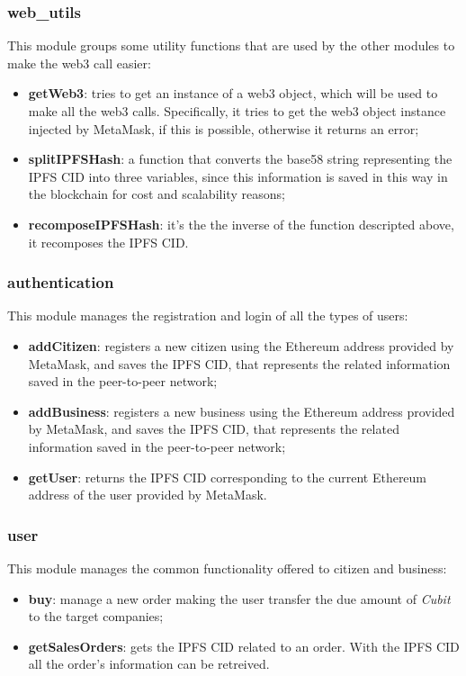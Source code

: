 \subsubsection{web\_utils}
This module groups some utility functions that are used by the other modules to make the web3 call easier:
\begin{itemize}
	\item \textbf{getWeb3}: tries to get an instance of a web3 object, which will be used to make all the web3 calls. Specifically, it tries to get the web3 object instance injected by MetaMask, if this is possible, otherwise it returns an error;
	\item \textbf{splitIPFSHash}: a function that converts the base58 string representing the IPFS CID into three variables, since this information is saved in this way in the blockchain for cost and scalability reasons;
	\item \textbf{recomposeIPFSHash}: it's the the inverse of the function descripted above, it recomposes the IPFS CID.
\end{itemize} 

\subsubsection{authentication}
This module manages the registration and login of all the types of users:
\begin{itemize}
	\item \textbf{addCitizen}: registers a new citizen using the Ethereum address provided by MetaMask, and saves the IPFS CID, that represents the related information saved in the peer-to-peer network;
	\item \textbf{addBusiness}: registers a new business using the Ethereum address provided by MetaMask, and saves the IPFS CID, that represents the related information saved in the peer-to-peer network;
	\item \textbf{getUser}: returns the IPFS CID corresponding to the current Ethereum address of the user provided by MetaMask.
\end{itemize}
\subsubsection{user}
This module manages the common functionality offered to citizen and business:
\begin{itemize}
	\item \textbf{buy}: manage a new order making the user transfer the due amount of \textit{Cubit} to the target companies;
	\item \textbf{getSalesOrders}: gets the IPFS CID related to an order. With the IPFS CID all the order's information can be retreived.
\end{itemize}

